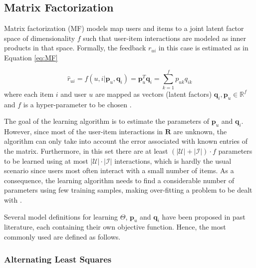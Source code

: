 




\subsection{Matrix Factorization}

    Matrix factorization (MF)  models map users and items to a joint latent factor space of dimensionality $f$ such that user-item interactions are modeled as inner products in that space. Formally, the feedback $r_{ui}$ in this case is estimated as in Equation \ref{eq:MF}
    
    \begin{equation}
        \label{eq:MF}
        \hat{r}_{ui} = f(u,i|\mathbf{p}_u, \mathbf{q}_i) = \mathbf{p}_u^T \mathbf{q}_i = \sum_{k=1}^f p_{uk}q_{ik}
    \end{equation} where each item $i$ and user $u$ are mapped as vectors (latent factors) $\mathbf{q}_i, \mathbf{p}_u \in \mathbb{R}^f$ and $f$ is a hyper-parameter to be chosen \cite{10.1145/3038912.3052569,2009MFTechniques}.
    
    The goal of the learning algorithm is to estimate the parameters of $\mathbf{p}_u$ and $\mathbf{q}_i$. However, since most of the user-item interactions in $\mathbf{R}$ are unknown, the algorithm can only take into account the error associated with known entries of the matrix. Furthermore, in this set there are at least $(|\mathcal{U}|+|\mathcal{I}|)\cdot f$ parameters to be learned using at most $|\mathcal{U}|\cdot |\mathcal{I}|$ interactions, which is hardly the usual scenario since users most often interact with a small number of items. As a consequence, the learning algorithm needs to find a considerable number of parameters using few training samples, making over-fitting a problem to be dealt with \cite{2008ALSWR}.
    
   Several model definitions for learning $\Theta$, $\mathbf{p}_u$ and $\mathbf{q}_i$ have been proposed in past literature, each containing their own objective function. Hence, the most commonly used are defined as follows.
   
   \subsubsection{Alternating Least Squares}
    
